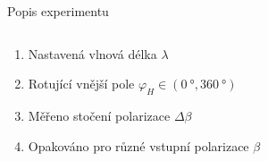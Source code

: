 \documentclass{beamer}
\begin{document}
\begin{frame}{Popis experimentu}
    \begin{columns}
        \begin{column}{0.55\textwidth}
            
    \begin{enumerate}
        \item Nastavená vlnová délka $\lambda$
        \item<2-> Rotující vnější pole $\varphi_{H} \in (\SI{0}{\degree},\SI{360}{\degree})$
        \item<3-> Měřeno stočení polarizace $\Delta\beta$
        \item<4-> Opakováno pro různé vstupní polarizace $\beta$
    \end{enumerate}
        \end{column}
        \begin{column}{0.45\textwidth}

\end{column}
\end{columns}
\end{frame}
\end{document}
